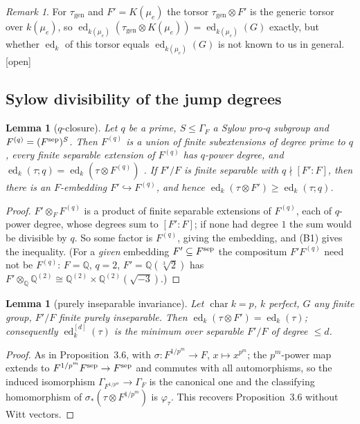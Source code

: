 \documentclass[11pt]{amsart}
\newtheorem{lemma}[theorem]{Lemma}
\theoremstyle{definition}
\theoremstyle{remark}
\newtheorem{remark}[theorem]{Remark}
\newcommand{\ed}{\operatorname{ed}}
\newcommand{\edd}[1]{\ed^{[#1]}}
\newcommand{\gen}{\mathrm{gen}}
\newcommand{\Q}{\mathbb Q}
\newcommand{\Gam}{\Gamma}
\newcommand{\stag}[1]{\hfill{\normalfont[#1]}}
\begin{document}
\begin{remark}
For $\tau_\gen$ and $F'=K(\mu_e)$ the torsor $\tau_\gen\otimes F'$ is the generic
torsor over $k(\mu_e)$, so $\ed_{k(\mu_e)}(\tau_\gen\otimes K(\mu_e))=\ed_{k(\mu_e)}(G)$
exactly, but whether $\ed_k$ of this torsor equals $\ed_{k(\mu_e)}(G)$ is not known to
us in general. [open]
\end{remark}

\subsection{Sylow divisibility of the jump degrees}

\begin{lemma}[$q$-closure]\label{lem:qcl}
Let $q$ be a prime, $S\le\Gam_F$ a Sylow pro-$q$ subgroup and $F^{(q)}=(F^{\rm sep})^S$.
Then $F^{(q)}$ is a union of finite subextensions of degree prime to $q$, every finite
separable extension of $F^{(q)}$ has $q$-power degree, and
$\ed_k(\tau;q)=\ed_k(\tau\otimes F^{(q)})$ \cite[(2.5)]{RS}. If $F'/F$ is finite
separable with $q\nmid[F':F]$, then there is an $F$-embedding $F'\hookrightarrow
F^{(q)}$, and hence $\ed_k(\tau\otimes F')\ge\ed_k(\tau;q)$.
\stag{cited; last statement proved}
\end{lemma}

\begin{proof}
$F'\otimes_FF^{(q)}$ is a product of finite separable extensions of $F^{(q)}$, each of
$q$-power degree, whose degrees sum to $[F':F]$; if none had degree $1$ the sum would
be divisible by $q$. So some factor is $F^{(q)}$, giving the embedding, and (B1)
gives the inequality. (For a \emph{given} embedding $F'\subseteq F^{\rm sep}$ the
compositum $F'F^{(q)}$ need not be $F^{(q)}$: $F=\Q$, $q=2$, $F'=\Q(\sqrt[3]2)$ has
$F'\otimes_\Q\Q^{(2)}\cong\Q^{(2)}\times\Q^{(2)}(\sqrt{-3})$.)
\end{proof}

\begin{lemma}[purely inseparable invariance]\label{lem:pi}
Let $\operatorname{char}k=p$, $k$ perfect, $G$ any finite group, $F'/F$ finite purely
inseparable. Then $\ed_k(\tau\otimes F')=\ed_k(\tau)$; consequently
$\edd d_k(\tau)$ is the minimum over \emph{separable} $F'/F$ of degree $\le d$.
\stag{proved}
\end{lemma}

\begin{proof}
As in Proposition~3.6, with $\sigma\colon F^{1/p^m}\to F$, $x\mapsto x^{p^m}$; the
$p^m$-power map extends to $F^{1/p^m}F^{\rm sep}\to F^{\rm sep}$ and commutes with all
automorphisms, so the induced isomorphism $\Gam_{F^{1/p^m}}\to\Gam_F$ is the canonical
one and the classifying homomorphism of $\sigma_*(\tau\otimes F^{1/p^m})$ is
$\varphi_\tau$. This recovers Proposition~3.6 without Witt vectors.
\end{proof}
\end{document}

